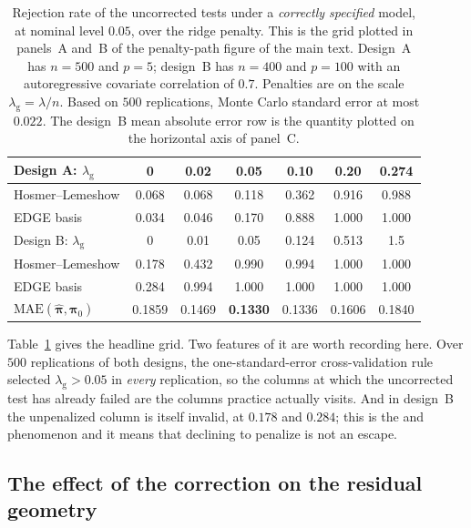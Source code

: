 \documentclass[11pt,a4paper]{article}
\newcommand{\bpi}{\boldsymbol{\pi}}
\theoremstyle{plain}
\theoremstyle{remark}
\begin{document}
\begin{table}[htbp]
\centering
\caption{Rejection rate of the uncorrected tests under a \emph{correctly specified}
model, at nominal level $0.05$, over the ridge penalty. This is the grid plotted in
panels~A and~B of the penalty-path figure of the main text. Design~A has $n = 500$ and
$p = 5$; design~B has $n = 400$ and $p = 100$ with an autoregressive covariate
correlation of $0.7$. Penalties are on the \citet{friedman2010} scale
$\lambda_{\mathrm{g}} = \lambda/n$. Based on $500$ replications, Monte Carlo standard
error at most $0.022$. The design~B mean absolute error row is the quantity plotted on
the horizontal axis of panel~C.}
\label{tab:naivegrid}
\begin{tabular}{lcccccc}
\toprule
Design A: $\lambda_{\mathrm{g}}$ & 0 & 0.02 & 0.05 & 0.10 & 0.20 & 0.274 \\
\midrule
Hosmer--Lemeshow & 0.068 & 0.068 & 0.118 & 0.362 & 0.916 & 0.988 \\
EDGE basis       & 0.034 & 0.046 & 0.170 & 0.888 & 1.000 & 1.000 \\
\midrule
Design B: $\lambda_{\mathrm{g}}$ & 0 & 0.01 & 0.05 & 0.124 & 0.513 & 1.5 \\
\midrule
Hosmer--Lemeshow & 0.178 & 0.432 & 0.990 & 0.994 & 1.000 & 1.000 \\
EDGE basis       & 0.284 & 0.994 & 1.000 & 1.000 & 1.000 & 1.000 \\
$\mathrm{MAE}(\hat{\bpi},\bpi_0)$ & 0.1859 & 0.1469 & \textbf{0.1330} & 0.1336 & 0.1606 & 0.1840 \\
\bottomrule
\end{tabular}
\end{table}

Table~\ref{tab:naivegrid} gives the headline grid. Two features of it are worth recording
here. Over $500$ replications of both designs, the one-standard-error cross-validation
rule selected $\lambda_{\mathrm{g}} > 0.05$ in \emph{every} replication, so the columns at
which the uncorrected test has already failed are the columns practice actually visits.
And in design~B the unpenalized column is itself invalid, at $0.178$ and $0.284$; this is
the \citet{sur2019} and \citet{candes2020} phenomenon and it means that declining to
penalize is not an escape.

\subsection{The effect of the correction on the residual geometry}\label{sec:geometry}
\end{document}
